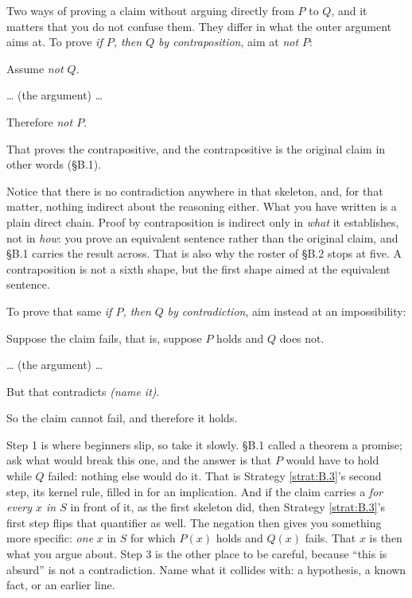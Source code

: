 \documentclass[a4paper,12pt,oneside]{memoir}
\begin{document}
 Two ways of proving a claim without arguing directly from \(P\) to \(Q\), and it matters that you do not confuse them. They differ in what the outer argument aims at. To prove \emph{if \(P\), then \(Q\)} \emph{by contraposition}, aim at \emph{not \(P\)}:

\begin{steps}
  \item Assume \emph{not \(Q\)}.
  \item … (the argument) …
  \item Therefore \emph{not \(P\)}.
  \item That proves the contrapositive, and the contrapositive is the original claim in other words (§B.1).
\end{steps}
Notice that there is no contradiction anywhere in that skeleton, and, for that matter, nothing indirect about the reasoning either. What you have written is a plain direct chain. Proof by contraposition is indirect only in \emph{what} it establishes, not in \emph{how}: you prove an equivalent sentence rather than the original claim, and §B.1 carries the result across. That is also why the roster of §B.2 stops at five. A contraposition is not a sixth shape, but the first shape aimed at the equivalent sentence.

To prove that same \emph{if \(P\), then \(Q\)} \emph{by contradiction}, aim instead at an impossibility:

\begin{steps}
  \item Suppose the claim fails, that is, suppose \(P\) holds and \(Q\) does not.
  \item … (the argument) …
  \item But that contradicts \emph{(name it)}.
  \item So the claim cannot fail, and therefore it holds.
\end{steps}
Step 1 is where beginners slip, so take it slowly. §B.1 called a theorem a promise; ask what would break this one, and the answer is that \(P\) would have to hold while \(Q\) failed: nothing else would do it. That is Strategy \ref{strat:B.3}’s second step, its kernel rule, filled in for an implication. And if the claim carries a \emph{for every \(x\) in \(S\)} in front of it, as the first skeleton did, then Strategy \ref{strat:B.3}’s first step flips that quantifier as well. The negation then gives you something more specific: \emph{one} \(x\) in \(S\) for which \(P(x)\) holds and \(Q(x)\) fails. That \(x\) is then what you argue about. Step 3 is the other place to be careful, because “this is absurd” is not a contradiction. Name what it collides with: a hypothesis, a known fact, or an earlier line.
\end{document}
